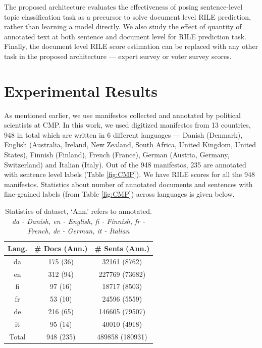 \documentclass[11pt,a4paper]{article}
\begin{document}

The proposed architecture evaluates the effectiveness of posing sentence-level topic classification task as a precursor to solve document level RILE prediction, rather than learning a model directly.  We also study the effect of quantity of annotated text at both sentence and document level for RILE prediction task. Finally, the document level RILE score estimation can be replaced with any other task in the proposed architecture --- expert survey or voter survey scores.


\section{Experimental Results}
As mentioned earlier, we use manifestos collected and annotated by political scientists at CMP. In this work, we used digitized manifestos from 13 countries, 948 in total which are written in 6 different languages --- Danish (Denmark), English (Australia, Ireland, New Zealand, South Africa, United Kingdom, United States), Finnish (Finland), French (France), German (Austria, Germany, Switzerland) and Italian (Italy). Out of the 948 manifestos, 235 are annotated with sentence level labels (Table \ref{fig:CMP}). We have RILE scores for all the 948 manifestos. Statistics about number of annotated documents and sentences with fine-grained labels (from Table \ref{fig:CMP}) across languages is given below.
 \begin{table}[!htp]
  \centering
  \begin{tabular}{ c c c }
  \toprule
    Lang. & \# Docs (Ann.) & \# Sents (Ann.)\\
    \midrule
    da  & 175 (36)  &  32161 (8762)	\\
    en   &  312 (94)& 227769 (73682) 	 \\    	
    fi  &  97 (16) &  18717 (8503) \\
    fr    & 53 (10) & 24596 (5559)\\
    de    & 216 (65) & 146605 (79507) \\
    it    & 95 (14)  & 40010 (4918)\\
\midrule
 Total    & 948 (235)  & 489858 (180931)\\
    \bottomrule

  \end{tabular}
  \caption{Statistics of dataset, `Ann.' refers to annotated. \textit{da - Danish, en - English, fi - Finnish, fr - French, de - German, it - Italian}}
  \label{tab:al}
\end{table}
\end{document}
